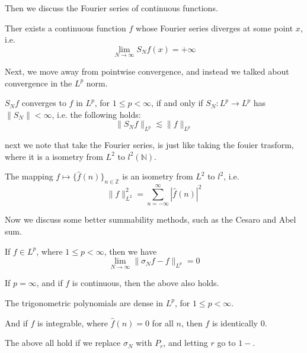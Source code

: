\documentclass[lang=en,10pt, color=black]{../elegantbook}
\newcommand{\Z}{\mathbb{Z}}
\newcommand{\N}{\mathbb{N}}
\begin{document}
Then we discuss the Fourier series of continuous functions.
\begin{theorem}
    Ther exists a continuous function $f$ whose Fourier series diverges at some point $x$, i.e.
    \begin{equation*}
        \lim_{N\to\infty}S_Nf(x)=+\infty
    \end{equation*}
\end{theorem}
\begin{comment}
    We showed this using uniform boundedness principle.
\end{comment}

Next, we move away from pointwise convergence, and instead we talked about convergence in the $L^p$ norm.
\begin{lemma}
    $S_Nf$ converges to $f$ in $L^p$, for $1\leq p<\infty$, if and only if $S_N: L^p\to L^p$ has $\|S_N\|<\infty$, i.e. the following holds:
    \begin{equation*}
        \|S_Nf\|_{L^p}\lesssim \|f\|_{L^p}
    \end{equation*}
\end{lemma}

next we note that take the Fourier series, is just like taking the fouier trasform, where it is a isometry from $L^2$ to $l^2(\N)$.
\begin{theorem}
    The mapping $f\mapsto \{\hat{f}(n)\}_{n\in\Z}$ is an isometry from $L^2$ to $l^2$, i.e.
    \begin{equation*}
        \|f\|_{L^2}^2=\sum_{n=-\infty}^\infty |\hat{f}(n)|^2
    \end{equation*}
\end{theorem}

Now we discuss some better summability methods, such as the Cesaro and Abel sum.
\begin{theorem}
    If $f\in L^p$, where $1\leq p<\infty$, then we have
    \begin{equation*}
        \lim_{N\to\infty}\|\sigma_Nf-f\|_{L^p}=0
    \end{equation*}

    If $p=\infty$, and if $f$ is continuous, then the above also holds.
\end{theorem}

\begin{corollary}
    The trigonometric polynomials are dense in $L^p$, for $1\leq p<\infty$.

    And if $f$ is integrable, where $\hat{f}(n)=0$ for all $n$, then $f$ is identically 0.
\end{corollary}
\begin{comment}
    The first one is by $\sigma_N(f)$ being a trig polynomials. And the second one is by Cesaro sum of Fourier series of $L^1$ functions would be 0, then $\int |f|=0$.
\end{comment}
\begin{note}
    The above all hold if we replace $\sigma_N$ with $P_r$, and letting $r$ go to $1-$.
\end{note}
\end{document}
